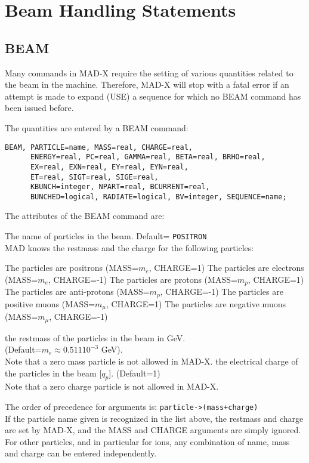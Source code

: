 \chapter{Beam Handling Statements} 
\label{chap:beam}

\section{BEAM}
\label{sec:beam}
Many commands in MAD-X require the setting of various quantities related
to the beam in the machine. Therefore, MAD-X will stop with a fatal
error if an attempt is made to expand (USE) a sequence for which no BEAM
command has been issued before.  

The quantities are entered by a BEAM command: 
\begin{verbatim}
BEAM, PARTICLE=name, MASS=real, CHARGE=real,
      ENERGY=real, PC=real, GAMMA=real, BETA=real, BRHO=real,
      EX=real, EXN=real, EY=real, EYN=real,
      ET=real, SIGT=real, SIGE=real,
      KBUNCH=integer, NPART=real, BCURRENT=real,
      BUNCHED=logical, RADIATE=logical, BV=integer, SEQUENCE=name;
\end{verbatim} 

The attributes of the BEAM command are: 
\begin{madlist}
   The name of particles in the beam. Default= {\tt POSITRON}\\
  MAD knows the restmass and the charge for the following particles:
  \begin{madlist}
     The particles are positrons (MASS=$m_e$, CHARGE=1)
     The particles are electrons (MASS=$m_e$, CHARGE=-1) 
     The particles are protons (MASS=$m_p$, CHARGE=1)
     The particles are anti-protons (MASS=$m_p$, CHARGE=-1) 
     The particles are positive muons (MASS=$m_{\mu}$, CHARGE=1) 
     The particles are negative muons (MASS=$m_{\mu}$, CHARGE=-1) 
  \end{madlist}
   the restmass of the particles in the beam in GeV. \\
  (Default=$m_e \approx 0.511 10^{-3}$ GeV).\\
  Note that a zero mass particle is not allowed in MAD-X.
  \label{beam_charge} the electrical charge of the
  particles in the beam [$q_p$]. (Default=1) \\
  Note that a zero charge particle is not allowed in MAD-X.
\end{madlist} 
The order of precedence for arguments is:  {\tt particle->(mass+charge)}\\ 
If the particle name given is recognized in the list above, the restmass
and charge are set by MAD-X, and the MASS and CHARGE arguments are
simply ignored. For other particles, and in particular for ions, any
combination of name, mass and charge can be entered independently.
\\


